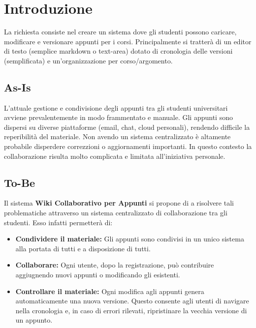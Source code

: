 \chapter{Introduzione}

\noindent La richiesta consiste nel creare un sistema dove gli studenti possono caricare, modificare e
versionare appunti per i corsi. 
Principalmente si tratterà di un editor di testo (semplice markdown o text-area) dotato di cronologia
delle versioni (semplificata) e un'organizzazione per corso/argomento.

\section{As-Is}
L'attuale gestione e condivisione degli appunti tra gli studenti universitari avviene prevalentemente in modo frammentato e manuale. Gli appunti sono dispersi su diverse piattaforme (email, chat, cloud personali), rendendo difficile la reperibilità del materiale. Non avendo un sistema centralizzato è altamente probabile disperdere correzzioni o aggiornamenti importanti. In questo contesto la collaborazione risulta molto complicata e limitata all'iniziativa personale.

\section{To-Be}
Il sistema \textbf{Wiki Collaborativo per Appunti} si propone di a risolvere tali problematiche attraverso un sistema centralizzato di collaborazione tra gli studenti. Esso infatti permetterà di:

\begin{itemize}
    \item \textbf{Condividere il materiale:} Gli appunti sono condivisi in un unico sistema alla portata di tutti e a disposizione di tutti.
    \item \textbf{Collaborare:} Ogni utente, dopo la registrazione, può contribuire aggiugnendo nuovi appunti o modificando gli esistenti.
    \item \textbf{Controllare il materiale:} Ogni modifica agli appunti genera automaticamente una nuova versione. Questo consente agli utenti di navigare nella cronologia e, in caso di errori rilevati, ripristinare la vecchia versione di un appunto.
\end{itemize}